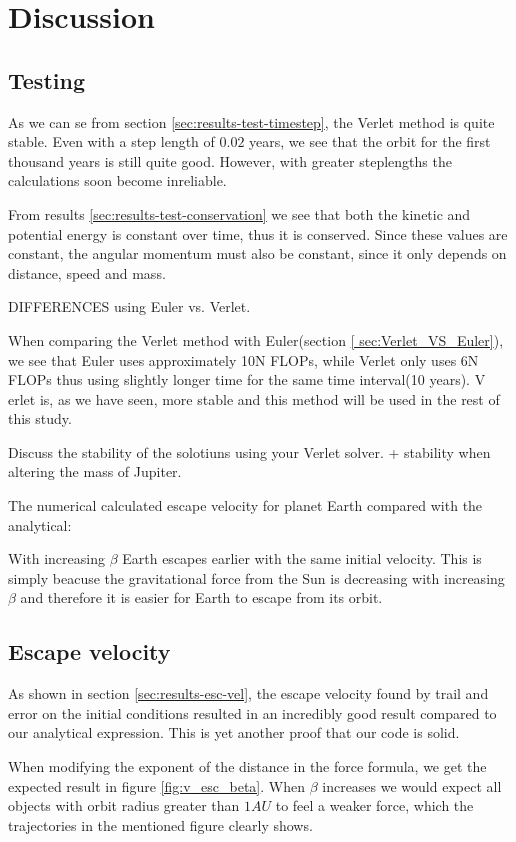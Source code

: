 \documentclass[../main.tex]{subfiles}
\begin{document}
\section{Discussion}\label{results}

\subsection{Testing}
As we can se from section \ref{sec:results-test-timestep}, the Verlet method is quite stable. Even with a step length of $0.02$ years, we see that the orbit for the first thousand years is still quite good. However, with greater steplengths the calculations soon become inreliable.

From results \ref{sec:results-test-conservation} we see that both the kinetic and potential energy is constant over time, thus it is conserved. Since these values are constant, the angular momentum must also be constant, since it only depends on distance, speed and mass.

DIFFERENCES using Euler vs. Verlet.

When comparing the Verlet method with Euler(section \ref{ sec:Verlet_VS_Euler}), we see that Euler uses approximately 10N FLOPs, while Verlet only uses 6N FLOPs thus using slightly longer time for the same time interval(10 years).
V
erlet is, as we have seen, more stable and this method will be used in the rest of this study.

Discuss the stability of the solotiuns using your Verlet solver.  + stability when altering the mass of Jupiter.

The numerical calculated escape velocity for planet Earth compared with the analytical:

With increasing $\beta$ Earth escapes earlier with the same initial velocity. This is simply beacuse the gravitational force from the Sun is decreasing with increasing $\beta$ and therefore it is easier for Earth to escape from its orbit.

\subsection{Escape velocity}
As shown in section \ref{sec:results-esc-vel}, the escape velocity found by trail and error on the initial conditions resulted in an incredibly good result compared to our analytical expression. This is yet another proof that our code is solid.

When modifying the exponent of the distance in the force formula, we get the expected result in figure \ref{fig:v_esc_beta}. When $\beta$ increases we would expect all objects with orbit radius greater than $1AU$ to feel a weaker force, which the trajectories in the mentioned figure clearly shows.
\end{document}
